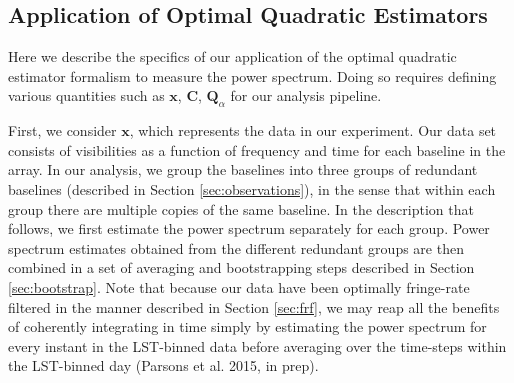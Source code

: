 \documentclass[twocolumn,numberedappendix]{emulateapj} \shorttitle{New Limits on the 21 cm Power Spectrum at $z=8.4$}
\newcommand{\x}{\mathbf{x}} \newcommand{\xhat}{\hat{\mathbf{x}}}
\newcommand{\phat}{\hat{\mathbf{p}}}
\newcommand{\qhat}{\hat{\mathbf{q}}}
\newcommand{\parsonscitep}{(Parsons et al. 2015, in prep)}
\begin{document}
%


\subsection{Application of Optimal Quadratic Estimators}
\label{sec:oqe_app}

Here we describe the specifics of our application of the optimal quadratic
estimator formalism to measure the power spectrum. Doing so requires defining
various quantities such as $\x$, $\mathbf{C}$, $\mathbf{Q}_\alpha$ for our analysis
pipeline.

First, we consider $\x$, which represents the data in our experiment.  Our data set consists
of visibilities as a function of frequency and time for each baseline in the
array. In our analysis, we group the baselines into three groups of redundant baselines (described in
Section \ref{sec:observations}), 
in the sense that within each group there are multiple copies of the same baseline. In the
description that follows, we first estimate the power spectrum separately for each group.
Power spectrum estimates obtained from the different redundant groups are then combined in a set of averaging and bootstrapping steps described in Section \ref{sec:bootstrap}. Note that because
our data have been optimally fringe-rate filtered in the manner described in Section \ref{sec:frf},
we may reap all the benefits of coherently integrating in time simply by estimating the power spectrum
for every instant in the LST-binned data before averaging over the time-steps within the LST-binned day \parsonscitep.
\end{document}
